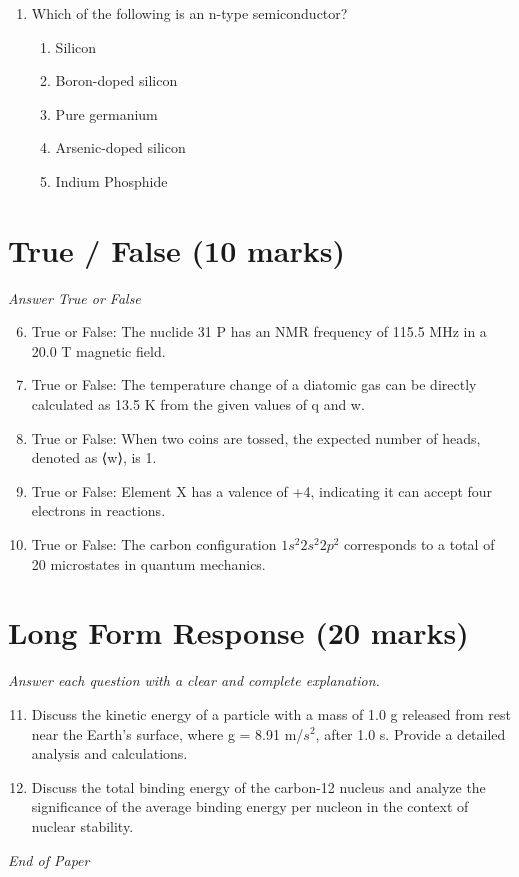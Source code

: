 \documentclass[12pt]{article}
\begin{document}
\begin{enumerate}[label=\arabic*.]
\begin{enumerate}[label=(\alph*)]
    \item O$_{2}$
    \item H$_{2}$O
    \item NH 3
\end{enumerate}
\item Which of the following is an n-type semiconductor?
\begin{enumerate}[label=(\alph*)]
    \item Silicon
    \item Boron-doped silicon
    \item Pure germanium
    \item Arsenic-doped silicon
    \item Indium Phosphide
\end{enumerate}
\end{enumerate}

\section*{True / False (10 marks)}
\textit{Answer True or False}
\begin{enumerate}[label=\arabic*.]
\setcounter{enumi}{5}
\item True or False: The nuclide 31 P has an NMR frequency of 115.5 MHz in a 20.0 T magnetic field.
\item True or False: The temperature change of a diatomic gas can be directly calculated as 13.5 K from the given values of q and w.
\item True or False: When two coins are tossed, the expected number of heads, denoted as ⟨w⟩, is 1.
\item True or False: Element X has a valence of +4, indicating it can accept four electrons in reactions.
\item True or False: The carbon configuration $1 s^2 2 s^2 2 p^2$ corresponds to a total of 20 microstates in quantum mechanics.
\end{enumerate}

\section*{Long Form Response (20 marks)}
\textit{Answer each question with a clear and complete explanation.}
\begin{enumerate}[label=\arabic*.]
\setcounter{enumi}{10}
\item Discuss the kinetic energy of a particle with a mass of 1.0 g released from rest near the Earth's surface, where g = 8.91 m/$s^2$, after 1.0 s. Provide a detailed analysis and calculations.
\item Discuss the total binding energy of the carbon-12 nucleus and analyze the significance of the average binding energy per nucleon in the context of nuclear stability.
\end{enumerate}

\vfill
\noindent\textit{End of Paper}
\end{document}
